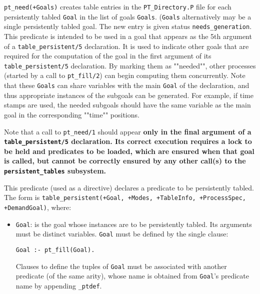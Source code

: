 \begin{description}
%
{\tt pt\_need(+Goals)} creates table entries in
the {\tt PT\_Directory.P} file for each persistently tabled {\tt Goal}
in the list of goals {\tt Goals}.  ({\tt Goals} alternatively may be a
single persistently tabled goal.  The new entry is given status
{\tt needs\_generation}.  This predicate is intended to be used in a
goal that appears as the 5th argument of a {\tt table\_persistent/5}
declaration.  It is used to indicate other goals that are required for
the computation of the goal in the first argument of its
{\tt table\_persistent/5} declaration.  By marking them as ""needed"",
other processes (started by a call to {\tt pt\_fill/2}) can begin
computing them concurrently.  Note that these {\tt Goals} can share
variables with the main {\tt Goal} of the declaration, and thus
appropriate instances of the subgoals can be generated.  For example,
if time stamps are used, the needed subgoals should have the same
variable as the main goal in the corresponding ""time"" positions.

Note that a call to {\tt pt\_need/1} should appear \bf{only} in the
final argument of a {\tt table\_persistent/5} declaration.  Its correct
execution requires a lock to be held and predicates to be loaded,
which are ensured when that goal is called, but cannot be correctly
ensured by any other call(s) to the {\tt persistent\_tables} subsystem.

%
This predicate (used as a directive)
declares a predicate to be persistently tabled.  The form is
{\tt table\_persistent(+Goal, +Modes, +TableInfo, +ProcessSpec,
+DemandGoal)}, where:

\begin{itemize}

\item{{\tt Goal}}: is the goal whose instances are to be persistently
tabled.  Its arguments must be distinct variables.
{\tt Goal} must be defined by the single clause:

\begin{verbatim}
Goal :- pt_fill(Goal).
\end{verbatim}

Clauses to define the tuples of {\tt Goal} must be associated with
another predicate (of the same arity), whose name is obtained from
{\tt Goal}'s predicate name by appending {\tt \_ptdef}.


\end{itemize}
\end{description}
